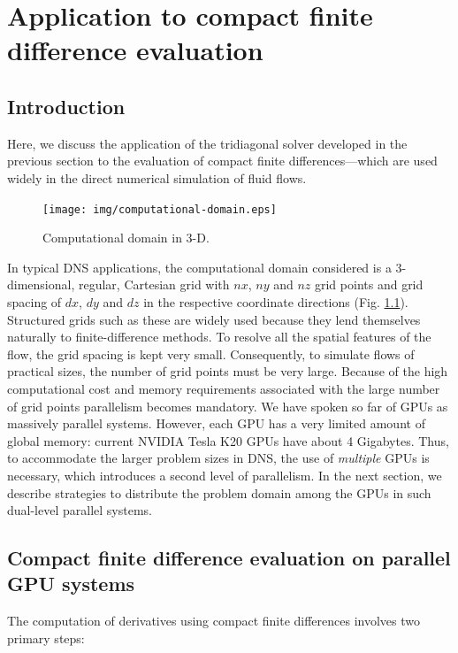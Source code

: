 \chapter{Application to compact finite difference evaluation}

\section{Introduction}

Here, we discuss the application of the
tridiagonal solver developed in the previous section
to the evaluation of compact finite differences---which
are used widely in the direct numerical simulation
of fluid flows.
%
\begin{figure}
\begin{center}
\texttt{[image: img/computational-domain.eps]}
\caption{Computational domain in 3-D.}
\label{fig:computational-domain}
\end{center}
\end{figure}
%
In typical DNS applications,
the computational domain considered
is a 3-dimensional,
regular, Cartesian grid with
$nx$, $ny$ and $nz$ grid points and grid spacing of
$dx$, $dy$ and $dz$ in the
respective coordinate directions
(Fig. \ref{fig:computational-domain}).
Structured grids such as these
are widely used because they lend themselves naturally
to finite-difference methods.
To resolve all the spatial features of the flow,
the grid spacing is kept very small.
Consequently,
to simulate flows of practical sizes,
the number of grid points must be very large.
Because of the high computational cost
and memory requirements associated with
the large number of grid points
parallelism becomes mandatory.
We have spoken so far of GPUs as massively parallel systems.
However, each GPU has a very limited amount of global memory:
current NVIDIA Tesla K20 GPUs have about 4 Gigabytes.
Thus, to accommodate the
larger problem sizes in DNS,
the use of \emph{multiple} GPUs is necessary,
which introduces a second level of parallelism.
In the next section,
we describe strategies to distribute
the problem domain among the GPUs
in such dual-level parallel systems.

\section{Compact finite difference evaluation on parallel GPU systems}

The computation of derivatives using
compact finite differences involves two primary steps:

